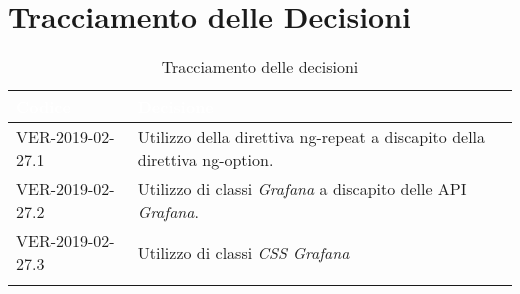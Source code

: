 
\section{Tracciamento delle Decisioni}

\begin{longtable}{|C{.40\textwidth}|C{.60\textwidth}|}
\hline
{}\textbf{\textcolor{white}{Codice}} & \textbf{\textcolor{white}{Decisione}}\\
\hline
VER-2019-02-27.1 & Utilizzo della direttiva ng-repeat a discapito della direttiva ng-option.\\
\hline
{}VER-2019-02-27.2 & Utilizzo di classi \textit{Grafana} a discapito delle API \textit{Grafana}. \\
\hline
VER-2019-02-27.3 & Utilizzo di classi \textit{CSS Grafana} \\
\hline

\caption{Tracciamento delle decisioni}
\end{longtable}
